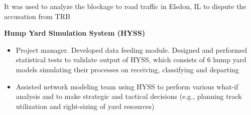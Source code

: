 \begin{cventries}
{\begin{cvitems}
{\begin{itemize}
\begin{itemize}
                   It was used to analyze the blockage to road traffic in Elsdon, IL to dispute the accusation from TRB
            \end{itemize}
        \end{itemize} 
	}
    \item {
        \textbf{Hump Yard Simulation System (HYSS)} 
        \begin{itemize}
        \item  Project manager. Developed data feeding module. Designed and performed statistical tests to validate output of HYSS,
              which consists of 6 hump yard models simulating their processes on receiving, classifying and departing
        \item  Assisted network modeling team using HYSS to perform various what-if analysis and to make strategic and tactical decisions (e.g., planning track utilization and right-sizing of yard resources)
        \end{itemize}     
    }
    \end{cvitems}
}





\end{cventries}
